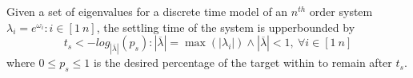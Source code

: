 \documentclass[sigconf]{llncs}
\begin{document}
\begin{theorem}
Given a set of eigenvalues for a discrete time model of an $n^{th}$ order system $\lambda_i =e^{\omega_i}: i \in [1\ n]$, the settling time of the system is upperbounded by
\begin{equation}
t_s<-log_{|\overline{\lambda}|}({p_s}) : |\overline{\lambda}| =\max(|\lambda_i|) \wedge |\overline{\lambda}|<1,\ \forall i \in [1\ n]
\label{eq:set_time}
\end{equation}
where $0\leq p_s \leq 1$ is the desired percentage of the target within to remain after $t_s$.
\end{theorem} 
\end{document}
